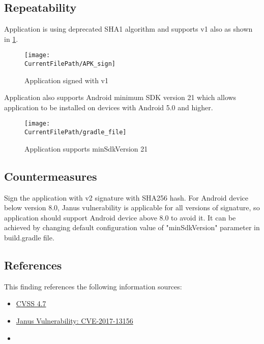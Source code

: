 \newpage
\subsection*{Repeatability}

Application is using deprecated SHA1 algorithm and supports v1 also as shown in \cref{figure:APK_sign}. 

\begin{figure}[H]
\centering
\texttt{[image: \\CurrentFilePath/APK\_sign]}
\caption{Application signed with v1}
\label{figure:APK_sign}
\end{figure}

\pagebreak
Application also supports Android minimum SDK version 21 which allows application to be installed on devices with Android 5.0 and higher.
\begin{figure}[H]
\centering
\texttt{[image: \\CurrentFilePath/gradle\_file]}
\caption{Application supports minSdkVersion 21}
\label{figure:gradle_file}
\end{figure}



\subsection*{Countermeasures}

Sign the application with v2 signature with SHA256 hash. For Android device below version 8.0, Janus vulnerability is applicable for all versions of signature, so application should support Android device above 8.0 to avoid it. It can be achieved by changing default configuration value of "minSdkVersion" parameter in build.gradle file.


\subsection*{References}

This finding references the following information sources:

\begin{itemize}
	\item \href{https://www.first.org/cvss/calculator/3.1#CVSS:3.1/AV:L/AC:H/PR:L/UI:N/S:U/C:N/I:H/A:N}
	{CVSS 4.7}
	\item \href{https://nvd.nist.gov/vuln/detail/CVE-2017-13156}
	{Janus Vulnerability: CVE-2017-13156}
	\item {}
\end{itemize}


